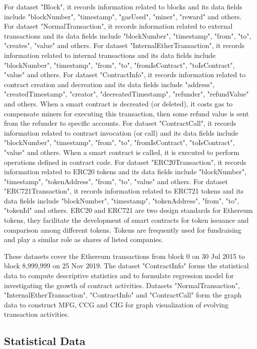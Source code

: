 For dataset "Block", it records information related to blocks and its data fields include "blockNumber", "timestamp", "gasUsed", "miner", "reward" and others. For dataset "NormalTransaction", it records information related to external transactions and its data fields include "blockNumber", "timestamp", "from", "to", "creates", "value" and others. For dataset "InternalEtherTransaction", it records information related to internal transactions and its data fields include "blockNumber", "timestamp", "from", "to", "fromIsContract", "toIsContract", "value" and others. For dataset "ContractInfo", it records information related to contract creation and decreation and its data fields include "address", "createdTimestamp", "creator", "decreatedTimestamp", "refunder", "refundValue" and others. When a smart contract is decreated (or deleted), it costs gas to compensate miners for executing this transaction, then some refund value is sent from the refunder to specific accounts. For dataset "ContractCall", it records information related to contract invocation (or call) and its data fields include "blockNumber", "timestamp", "from", "to", "fromIsContract", "toIsContract", "value" and others. When a smart contract is called, it is executed to perform operations defined in contract code. For dataset "ERC20Transaction", it records information related to ERC20 tokens and its data fields include "blockNumber", "timestamp", "tokenAddress", "from", "to", "value" and others. For dataset "ERC721Transaction", it records information related to ERC721 tokens and its data fields include "blockNumber", "timestamp", "tokenAddress", "from", "to", "tokenId" and others. ERC20 and ERC721 are two design standards for Ethereum tokens, they facilitate the development of smart contracts for token issuance and comparison among different tokens. Tokens are frequently used for fundraising and play a similar role as shares of listed companies.

These datasets cover the Ethereum transactions from block 0 on 30 Jul 2015 to block 8,999,999 on 25 Nov 2019. The dataset "ContractInfo" forms the statistical data to compute descriptive statistics and to formulate regression model for investigating the growth of contract activities. Datasets "NormalTransaction", "InternalEtherTransaction", "ContractInfo" and "ContractCall" form the graph data to construct MFG, CCG and CIG for graph visualization of evolving transaction activities.

\subsection{Statistical Data}
\label{sec:methodology:data:statistical}


